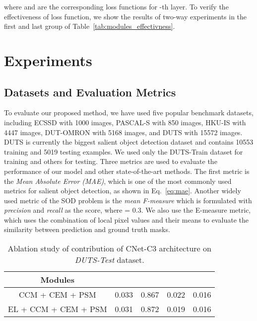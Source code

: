 \documentclass[10pt,twocolumn,letterpaper]{article}
\begin{document}
where  and  are the corresponding loss functions for -th layer. To verify the effectiveness of  loss function, we show the results of two-way experiments in the first and last group of Table~\ref{tab:modules_effectivness}.

\section{Experiments}
\subsection{Datasets and Evaluation Metrics}
\label{seq:dataset_metrics}
To evaluate our proposed method, we have used five popular benchmark datasets, including ECSSD \cite{ECSSD} with 1000 images, PASCAL-S \cite{PASCAL-S} with 850 images, HKU-IS \cite{HKU-IS} with 4447 images, DUT-OMRON \cite{DUT-OMRON} with 5168 images, and DUTS \cite{DUTs} with 15572 images. DUTS is currently the biggest  salient object detection dataset and contains 10553 training and 5019 testing examples. We used only the DUTS-Train dataset for training and others for testing. Three metrics are used to evaluate the performance of our model and other state-of-the-art methods. The first metric is the \textit{Mean Absolute Error (MAE)}, which is one of the most commonly used metrics for salient object detection, as shown in Eq.~\ref{eq:mae}. Another widely used metric of the SOD problem is the \textit{mean F-measure}  which is formulated with \textit{precision} and \textit{recall} as the  score, where  = 0.3. We also use the E-measure  \cite{Emeasure} metric, which uses the combination of local pixel values and their means to evaluate the similarity between prediction and ground truth masks.

\begin{table}[t]
\footnotesize
\begin{center}
\begin{tabular}{|c|c|c|c|c|}
\hline
Modules &  &  &  &  \\
\hline\hline
CCM + CEM + PSM & 0.033 & 0.867 & 0.022 & 0.016 \\
EL + CCM + CEM + PSM & 0.031 & 0.872 & 0.019 & 0.016 \\
\hline
\end{tabular}
\end{center}
\caption{Ablation study of  contribution of CNet-C3 architecture on \textit{DUTS-Test} dataset.}
\label{tab:el_contrib}
\end{table}
\end{document}
